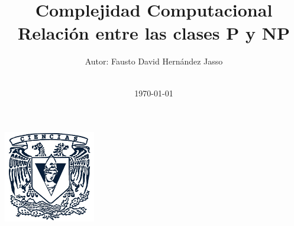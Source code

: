 \title{\Large Complejidad Computacional  \\[0.5cm]
        \bf\Large Relación entre las clases \(\mathbf{P}\) y \(\mathbf{NP}\)}
\author{\large Autor: Fausto David Hernández Jasso\\ \ \\}
\date{\large \today}

\makeatletter
    \begin{titlepage}
        \begin{center}
	   { \includegraphics[width=4cm]{facultad-de-ciencias.jpg}}
	   {\ \\ \ \\}
        \vbox{}\vspace{5cm}
            {\@title }\\[3cm] 
            {\@author}
            {\@date\\}

        \end{center}
    \end{titlepage}
\makeatother
